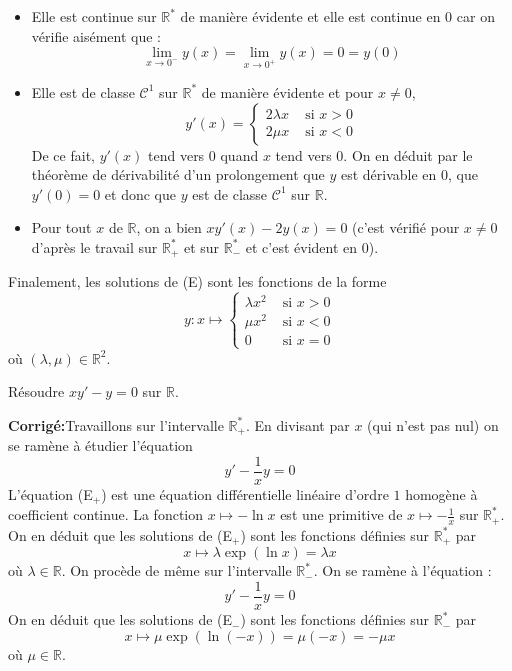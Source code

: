 \documentclass[a4paper,twoside,french,11pt]{VcCours}
\newcommand{\corr}{\textbf{Corrigé:}}
\begin{document}
\begin{itemize}
\item Elle est continue sur $\mathbb R^*$ de manière évidente et elle est continue en $0$ car on vérifie aisément que :
 $$\lim\limits_{x \to 0^-} y(x) = \lim\limits_{x \to 0^+} y(x) = 0 = y(0)$$
\item Elle est de classe $\mathcal C^1$ sur $\mathbb R^*$ de manière évidente et pour $x \neq 0$, 
$$y'(x) =  \left\{\begin{array}{ll} 2\lambda x & \text{ si } x > 0 \\ 2\mu x & \text{ si } x < 0 \end{array}\right.$$
De ce fait, $y'(x)$ tend vers $0$ quand $x$ tend vers $0$. On en déduit par le théorème de dérivabilité d'un prolongement que $y$ est dérivable en $0$, que $y'(0)=0$ et donc que $y$ est de classe $\mathcal C^1$ sur $\mathbb R$.
\item Pour tout $x$ de $\mathbb R$, on a bien $xy'(x) -2y(x) = 0$ (c'est vérifié pour $x \neq 0$ d'après le travail sur $\mathbb{R}_+^*$ et sur $\mathbb{R}_{-}^*$ et c'est évident en $0$).
\end{itemize}
Finalement, les solutions de (E) sont les fonctions de la forme
$$y  : x \mapsto \left\{\begin{array}{ll} \lambda x^2 & \text{ si } x > 0 \\ \mu x^2 & \text{ si } x < 0 \\   0 & \text{ si } x = 0\end{array}\right.$$
où $(\lambda,\mu) \in \mathbb R^2$.

\begin{Exercice}{} Résoudre $xy' -y = 0$ sur $\mathbb{R}$.
\end{Exercice}

\corr Travaillons sur l'intervalle $\mathbb R_+^*$. En divisant par $x$ (qui n'est pas nul) on se ramène à étudier l'équation
\begin{equation}
\tag{E$_+$}
y'  -\dfrac{1}{x}y = 0
\end{equation}
L'équation (E$_+$) est une équation différentielle  linéaire d'ordre $1$ homogène à coefficient continue. La fonction $x \mapsto -\ln x$ est une primitive de $x \mapsto - \frac{1}{x}$ sur $\mathbb R_+^*$. On en déduit que les solutions de (E$_+$) sont les fonctions définies sur $\mathbb R_+^*$ par 
$$x \mapsto \lambda \exp(\ln x) = \lambda x$$
où $\lambda  \in \mathbb R$. On procède de même sur l'intervalle $\mathbb R_-^*$. On se ramène à l'équation :
\begin{equation}
\tag{E$_-$}
y' -\dfrac{1}{x}y = 0
\end{equation}
On en déduit que les solutions de (E$_-$) sont les fonctions définies sur $\mathbb R_-^*$ par 
$$x \mapsto \mu\exp(\ln (-x)) = \mu(-x) = -\mu x$$
où $\mu \in \mathbb R$.
\end{document}
